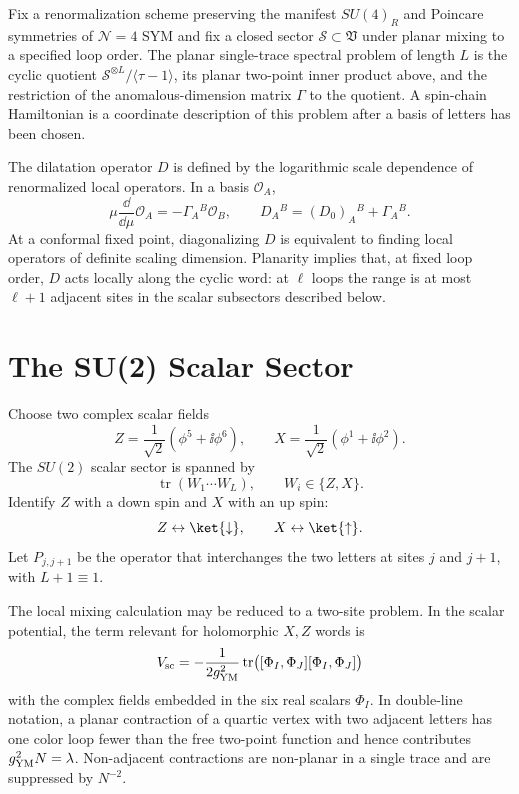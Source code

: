 \begin{definition}
\label{def:planar-single-trace-spectral-problem}
Fix a renormalization scheme preserving the manifest \(SU(4)_R\) and
Poincare symmetries of \(\mathcal N=4\) SYM and fix a closed sector
\(\mathcal S\subset \mathfrak V\) under planar mixing to a specified loop
order.  The planar single-trace spectral problem of length \(L\) is the cyclic
quotient \(\mathcal S^{\otimes L}/\langle\tau-1\rangle\), its planar
two-point inner product above, and the restriction of the anomalous-dimension
matrix \(\Gamma\) to the quotient.  A spin-chain Hamiltonian is a coordinate
description of this problem after a basis of letters has been chosen.
\end{definition}

The dilatation operator \(D\) is defined by the logarithmic scale dependence
of renormalized local operators.  In a basis \(\mathcal O_A\),
\[
  \mu\frac{\dd}{\dd\mu}\mathcal O_A
  =
  -\Gamma_A{}^B\mathcal O_B,\qquad
  D_A{}^B=(D_0)_A{}^B+\Gamma_A{}^B .
\]
At a conformal fixed point, diagonalizing \(D\) is equivalent to finding local
operators of definite scaling dimension.  Planarity implies that, at fixed
loop order, \(D\) acts locally along the cyclic word: at \(\ell\) loops the
range is at most \(\ell+1\) adjacent sites in the scalar subsectors described
below.

\section{The SU(2) Scalar Sector}

Choose two complex scalar fields
\[
  Z=\frac{1}{\sqrt2}(\phi^5+\ii\phi^6),
  \qquad
  X=\frac{1}{\sqrt2}(\phi^1+\ii\phi^2).
\]
The \(SU(2)\) scalar sector is spanned by
\[
  \operatorname{tr}(W_1\cdots W_L),\qquad W_i\in\{Z,X\}.
\]
Identify \(Z\) with a down spin and \(X\) with an up spin:
\[
  Z\leftrightarrow\ket{\downarrow},\qquad
  X\leftrightarrow\ket{\uparrow}.
\]
Let \(P_{j,j+1}\) be the operator that interchanges the two letters at sites
\(j\) and \(j+1\), with \(L+1\equiv1\).

The local mixing calculation may be reduced to a two-site problem.  In the
scalar potential, the term relevant for holomorphic \(X,Z\) words is
\[
  V_{\rm sc}
  =
  -\frac{1}{2g_{\rm YM}^2}
  \operatorname{tr}\bigl([\Phi_I,\Phi_J][\Phi_I,\Phi_J]\bigr)
\]
with the complex fields embedded in the six real scalars \(\Phi_I\).  In
double-line notation, a planar contraction of a quartic vertex with two
adjacent letters has one color loop fewer than the free two-point function
and hence contributes \(g_{\rm YM}^2N=\lambda\).  Non-adjacent contractions
are non-planar in a single trace and are suppressed by \(N^{-2}\).


